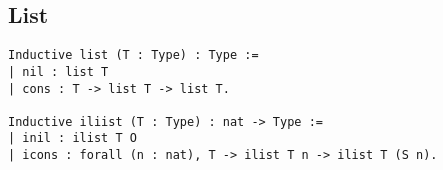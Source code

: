 \subsection*{List}
\begin{center}
\begin{verbatim}
Inductive list (T : Type) : Type :=
| nil : list T
| cons : T -> list T -> list T.

Inductive iliist (T : Type) : nat -> Type :=
| inil : ilist T O
| icons : forall (n : nat), T -> ilist T n -> ilist T (S n).
\end{verbatim}
\end{center}
